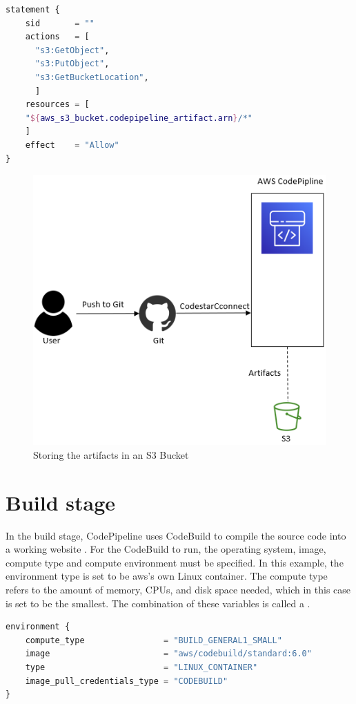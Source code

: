 \vspace{4mm}
\begin{lstlisting}[language=terraform, caption=Set permissions to CodePipeline, captionpos=b, frame=single, label=lst:grantaccess]
statement {
    sid       = ""
    actions   = [
      "s3:GetObject",
      "s3:PutObject",
      "s3:GetBucketLocation", 
      ]
    resources = [
    "${aws_s3_bucket.codepipeline_artifact.arn}/*"
    ]
    effect    = "Allow"
}
\end{lstlisting}

\vspace{2mm}
\begin{figure}[H]
    \centering
    \includegraphics[width=0.6\columnwidth]{Images/aws-piplin-2.png}
    \caption{Storing the artifacts in an S3 Bucket}
    \label{fig: Storing the artifacts in an S3 Bucket}
\end{figure}

\section{Build stage}
In the build stage, CodePipeline uses CodeBuild to compile the source code into a working website \cite{CodeBuildProcess}. For the CodeBuild to run, the operating system, image, compute type and compute environment must be specified. In this example, the environment type is set to be \acrshort{aws}'s own Linux container. The compute type refers to the amount of memory, CPUs, and disk space needed, which in this case is set to be the smallest. The combination of these variables is called a .

\vspace{2mm}
\begin{lstlisting}[language=terraform, caption=Create a build environment, captionpos=b, frame=single]
environment {
    compute_type                = "BUILD_GENERAL1_SMALL"
    image                       = "aws/codebuild/standard:6.0"
    type                        = "LINUX_CONTAINER"
    image_pull_credentials_type = "CODEBUILD"
}
\end{lstlisting}

